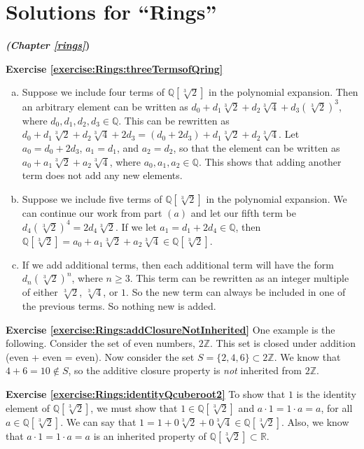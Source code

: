 
\section{Solutions for ``Rings''}
\noindent\textbf{\textit{ (Chapter \ref{rings}})}\bigskip

\noindent\textbf{Exercise \ref{exercise:Rings:threeTermsofQring}}
\begin{enumerate}[(a)]
\item Suppose we include four terms of ${\mathbb Q}[\sqrt[3]{2}]$ in the polynomial expansion.  Then an arbitrary element can be written as $d_0+d_1\sqrt[3]{2}+d_2\sqrt[3]{4}+d_3(\sqrt[3]{2})^3$, where $d_0,d_1,d_2,d_3\in{\mathbb Q}$. This can be rewritten as $d_0+d_1\sqrt[3]{2}+d_2\sqrt[3]{4}+2d_3=(d_0+2d_3)+d_1\sqrt[3]{2}+d_2\sqrt[3]{4}$.  Let $a_0=d_0+2d_3$, $a_1=d_1$, and $a_2=d_2$, so that the element can be written as $a_0+a_1\sqrt[3]{2}+a_2\sqrt[3]{4}$, where $a_0,a_1,a_2\in {\mathbb Q}$.  This shows that adding another term does not add any new elements.
\item Suppose we include five terms of ${\mathbb Q}[\sqrt[3]{2}]$ in the polynomial expansion.  We can continue our work from part $(a)$ and let our fifth term be $d_4(\sqrt[3]{2})^4=2d_4\sqrt[3]{2}$.  If we let $a_1=d_1+2d_4\in{\mathbb Q}$, then ${\mathbb Q}[\sqrt[3]{2}]=a_0+a_1\sqrt[3]{2}+a_2\sqrt[3]{4}\in{\mathbb Q}[\sqrt[3]{2}]$.
\item If we add additional terms, then each additional term will have the form $d_n(\sqrt[3]{2})^n$, where $n\ge 3$.  This term can be rewritten as an integer multiple of either $\sqrt[3]{2}$, $\sqrt[3]{4}$, or $1$.  So the new term can always be included in one of the previous terms. So nothing new is added.
\end{enumerate}

\noindent\textbf{Exercise \ref{exercise:Rings:addClosureNotInherited}}
One example is the following. Consider the set of even numbers, $2{\mathbb Z}$.  This set is closed under addition (even + even = even).  Now consider the set $S=\{2,4,6\}\subset 2{\mathbb Z}$.  We know that $4+6=10\notin S$, so the additive closure property is \emph{not} inherited from $2{\mathbb Z}$.

\noindent\textbf{Exercise \ref{exercise:Rings:identityQcuberoot2}}
To show that $1$ is the identity element of ${\mathbb Q}[\sqrt[3]{2}]$, we must show that $1\in{\mathbb Q}[\sqrt[3]{2}]$ and $a\cdot 1=1\cdot a=a$, for all $a\in{\mathbb Q}[\sqrt[3]{2}]$. We can say that $1=1+0\sqrt[3]{2}+0\sqrt[3]{4}\in{\mathbb Q}[\sqrt[3]{2}]$. Also, we know that  $a\cdot1=1\cdot a=a$ is an inherited property of ${\mathbb Q}[\sqrt[3]{2}]\subset{\mathbb R}$.

